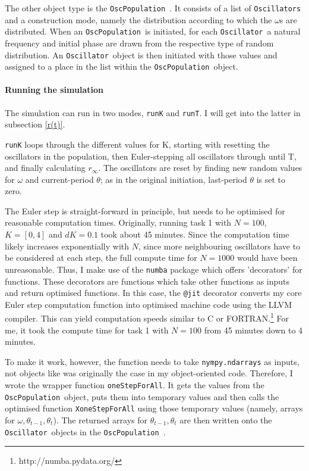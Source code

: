 \documentclass[10pt,a4paper]{article}
\newcommand{\osc}{\texttt{Oscillator}~}
\newcommand{\oscpop}{\texttt{OscPopulation}~}
\begin{document}
The other object type is the \oscpop. 
It consists of a list of \texttt{Oscillators} and a construction mode, namely the distribution according to which the $\omega$s are distributed.
When an \oscpop is initiated, for each \osc a natural frequency and initial phase are drawn from the respective type of random distribution. 
An \osc object is then initiated with those values and assigned to a place in the list within the \oscpop object.


\paragraph{Running the simulation}

The simulation can run in two modes, \texttt{runK} and \texttt{runT}. 
I will get into the latter in subsection \ref{r(t)}.

\texttt{runK} loops through the different values for K, starting with resetting the oscillators in the population, then Euler-stepping all oscillators through until T, and finally calculating $r_\infty$. 
The oscillators are reset by finding new random values for $\omega$ and current-period $\theta$; as in the original initiation, last-period $\theta$ is set to zero.

The Euler step is straight-forward in principle, but needs to be optimised for reasonable computation times. 
Originally, running task 1 with $ N = 100$, $K = [0, 4]$ and $dK = 0.1$ took about 45 minutes. 
Since the computation time likely increases exponentially with $N$, since more neighbouring oscillators have to be considered at each step, the full compute time for $N=1000$ would have been unreasonable. 
Thus, I make use of the \texttt{numba} package which offers 'decorators' for functions. 
These decorators are functions which take other functions as inputs and return optimised functions.
In this case, the \texttt{@jit} decorator converts my core Euler step computation function into optimised machine code using the LLVM compiler. 
This can yield computation speeds similar to C or FORTRAN.\footnote{http://numba.pydata.org/}
For me, it took the compute time for task 1 with $ N = 100$ from 45 minutes down to 4 minutes. 

To make it work, however, the function needs to take \texttt{nympy.ndarrays} as inputs, not objects like was originally the case in my object-oriented code. 
Therefore, I wrote the wrapper function \texttt{oneStepForAll}. 
It gets the values from the \oscpop object, puts them into temporary values and then calls the optimised function \texttt{XoneStepForAll} using those temporary values (namely, arrays for $\omega, \theta_{t-1}, \theta_{t}$).
The returned arrays for $\theta_{t-1}, \theta_{t}$ are then written onto the \osc objects in the \oscpop. 
\end{document}
